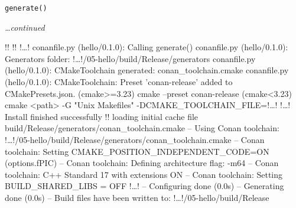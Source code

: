 \documentclass[compress, 8pt, aspectratio=169]{beamer}
\begin{document}
\begin{frame}[fragile]{\texttt{generate()}}

  \textit{\dots continued}\bigbreak

  {\small
  \begin{terminalwindow}[!!][minted options={escapeinside=!!, firstline=12}]
!!
!!
!\dots!
conanfile.py (hello/0.1.0): Calling generate()
conanfile.py (hello/0.1.0): Generators folder: !\dots!/05-hello/build/Release/generators
conanfile.py (hello/0.1.0): CMakeToolchain generated: conan_toolchain.cmake
conanfile.py (hello/0.1.0): CMakeToolchain: Preset 'conan-release' added to CMakePresets.json.
    (cmake>=3.23) cmake --preset conan-release
    (cmake<3.23) cmake <path> -G "Unix Makefiles" -DCMAKE_TOOLCHAIN_FILE=!\dots!
!\dots!
Install finished successfully
!!
loading initial cache file build/Release/generators/conan_toolchain.cmake
-- Using Conan toolchain: !\dots!/05-hello/build/Release/generators/conan_toolchain.cmake
-- Conan toolchain: Setting CMAKE_POSITION_INDEPENDENT_CODE=ON (options.fPIC)
-- Conan toolchain: Defining architecture flag: -m64
-- Conan toolchain: C++ Standard 17 with extensions ON
-- Conan toolchain: Setting BUILD_SHARED_LIBS = OFF
!\dots!
-- Configuring done (0.0s)
-- Generating done (0.0s)
-- Build files have been written to: !\dots!/05-hello/build/Release
  \end{terminalwindow}
  }

\end{frame}
\end{document}
